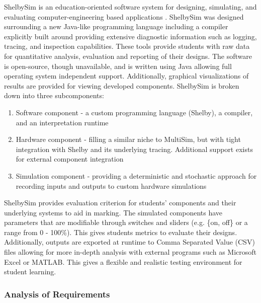 ShelbySim is an education-oriented software system for designing, simulating, and evaluating computer-engineering based applications \cite{Tappan2009, Tappan2009-2}. ShelbySim was designed surrounding a new Java-like programming language including a compiler explicitly built around providing extensive diagnostic information such as logging, tracing, and inspection capabilities. These tools provide students with raw data for quantitative analysis, evaluation and reporting of their designs. The software is open-source, though unavailable, and is written using Java allowing full operating system independent support. Additionally, graphical visualizations of results are provided for viewing developed components. ShelbySim is broken down into three subcomponents:
\begin{enumerate}
    \item Software component - a custom programming language (Shelby), a compiler, and an interpretation runtime
    \item Hardware component - filling a similar niche to MultiSim, but with tight integration with Shelby and its underlying tracing. Additional support exists for external component integration
    \item Simulation component - providing a deterministic and stochastic approach for recording inputs and outputs to custom hardware simulations
\end{enumerate} 

ShelbySim provides evaluation criterion for students' components and their underlying systems to aid in marking. The simulated components have parameters that are modifiable through switches and sliders (e.g. \{on, off\} or a range from 0 - 100\%). This gives students metrics to evaluate their designs. Additionally, outputs are exported at runtime to Comma Separated Value (CSV) files allowing for more in-depth analysis with external programs such as Microsoft Excel or MATLAB. This gives a flexible and realistic testing environment for student learning. 

\subsubsection*{Analysis of Requirements}

